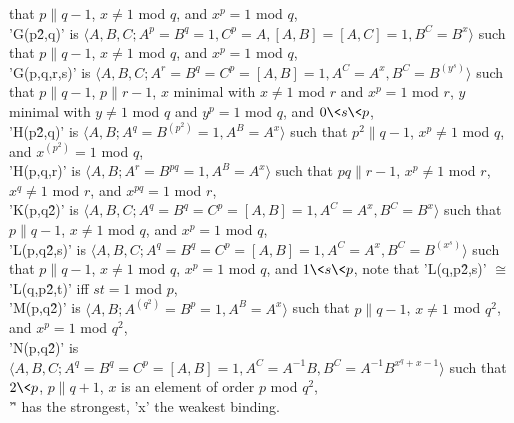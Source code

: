     that $p\|q-1$, $x \neq 1$ mod $q$, and $x^p = 1$ mod $q$,
    \smallskip\\
    'G(p\^2,q)' is $\langle A, B, C ; A^p = B^q = 1, C^p = A, [A,B] =
    [A,C] = 1, B^C = B^x \rangle$ such that $p\|q-1$, $x \neq 1$ mod
    $q$, and $x^p = 1$ mod $q$, \smallskip\\
    'G(p,q,r,s)' is $\langle A, B, C ; A^r = B^q = C^p = [A,B] = 1, A^C =
    A^x, B^C = B^{(y^s)} \rangle$ such that $p\|q-1$, $p\|r-1$, $x$
    minimal with $x \neq 1$ mod $r$ and $x^p = 1$ mod $r$, $y$ minimal
    with $y \neq 1$ mod $q$ and $y^p = 1$ mod $q$, and $0 \< s \<
    p$,\smallskip\\
    'H(p\^2,q)' is $\langle A, B ; A^q = B^{(p^2)} = 1, A^B = A^x
    \rangle$ such that $p^2\|q-1$, $x^p \neq 1$ mod $q$, and $x^{(p^2)} =
    1$ mod $q$, \smallskip\\
    'H(p,q,r)' is $\langle A, B ; A^r = B^{pq} = 1, A^B = A^x \rangle$
    such that $pq\|r-1$, $x^p \neq 1$ mod $r$, $x^q \neq 1$ mod $r$, and
    $x^{pq} = 1$ mod $r$, \smallskip\\
    'K(p,q\^2)' is $\langle A, B, C ; A^q = B^q = C^p = [A,B] = 1, A^C =
    A^x, B^C = B^x \rangle$ such that $p\|q-1$, $x \neq 1$ mod $q$, and
    $x^p = 1$ mod $q$, \smallskip\\
    'L(p,q\^2,s)' is $\langle A, B, C ; A^q = B^q = C^p = [A,B] = 1, A^C
    = A^x, B^C = B^{(x^s)} \rangle$ such that $p\|q-1$, $x \neq 1$ mod
    $q$, $x^p = 1$ mod $q$, and $1 \< s \< p$, note that
    'L(q,p\^2,s)' $\cong$ 'L(q,p\^2,t)' iff $s t = 1$ mod $p$, \smallskip\\
    'M(p,q\^2)' is $\langle A, B ; A^{(q^2)} = B^p = 1, A^B = A^x
    \rangle$ such that $p\|q-1$, $x \neq 1$ mod $q^2$, and $x^p = 1$ mod
    $q^2$, \smallskip\\
    'N(p,q\^2)' is $\langle A, B, C ; A^q = B^q = C^p = [A,B] = 1, A^C =
    A^{-1}B, B^C = A^{-1}B^{x^q+x-1} \rangle$ such that $2 \< p$,
    $p\|q+1$, $x$ is an element of order $p$ mod $q^2$, \smallskip\\
    '\^' has the strongest,  'x'  the weakest binding.

